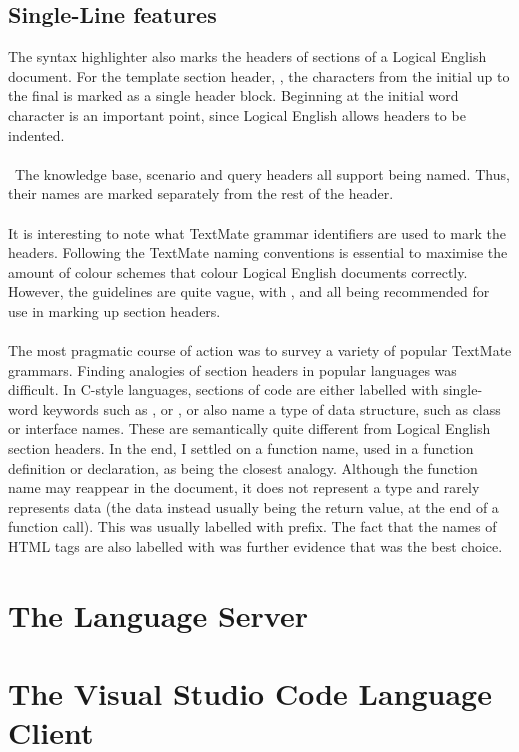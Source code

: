 \documentclass[../main.tex]{subfiles}
\begin{document}
\subsection{Single-Line features}
The syntax highlighter also marks the headers of sections of a Logical English document. For the template section header, , the characters from the initial  up to the final  is marked as a single header block. Beginning at the initial word character is an important point, since Logical English allows headers to be indented. 
\\ 
\\\
The knowledge base, scenario and query headers all support being named. Thus, their names are marked separately from the rest of the header. 
\\ 
\\
It is interesting to note what TextMate grammar identifiers are used to mark the headers. Following the TextMate naming conventions \cite{textmate_grammars_spec} is essential to maximise the amount of colour schemes that colour Logical English documents correctly. However, the guidelines are quite vague, with ,  and  all being recommended for use in marking up section headers. 
\\ 
\\
The most pragmatic course of action was to survey a variety of popular TextMate grammars. Finding analogies of section headers in popular languages was difficult. In C-style languages, sections of code are either labelled with single-word keywords such as ,  or , or also name a type of data structure, such as class or interface names. These are semantically quite different from Logical English section headers. In the end, I settled on a function name, used in a function definition or declaration, as being the closest analogy. Although the function name may reappear in the document, it does not represent a type and rarely represents data (the data instead usually being the return value, at the end of a function call). This was usually labelled with  prefix. The fact that the names of HTML tags are also labelled with  was further evidence that  was the best choice.

\section{The Language Server}

\section{The Visual Studio Code Language Client}
\end{document}
